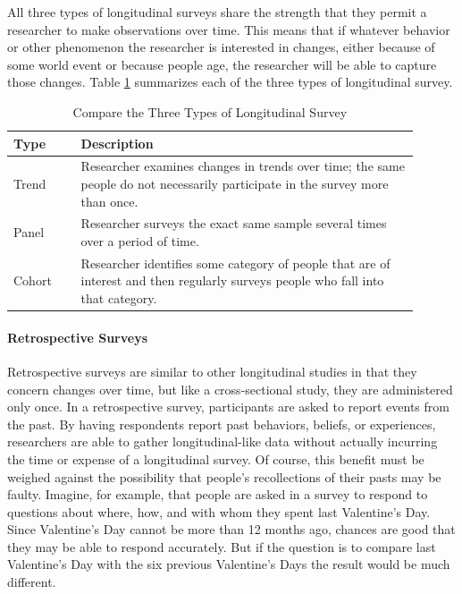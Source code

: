 All three types of longitudinal surveys share the strength that they permit a researcher to make observations over time. This means that if whatever behavior or other phenomenon the researcher is interested in changes, either because of some world event or because people age, the researcher will be able to capture those changes. Table \ref{tab08.01} summarizes each of the three types of longitudinal survey.

\begin{table}[H]
	\centering
	\begin{tabularx}{0.95\linewidth}{p{0.15\linewidth}p{0.75\linewidth}}
		\toprule
		\textbf{Type} & \textbf{Description} \\
		\midrule
		Trend & Researcher examines changes in trends over time; the same people do not necessarily participate in the survey more than once. \\
		Panel & Researcher surveys the exact same sample several times over a period of time. \\
		Cohort & Researcher identifies some category of people that are of interest and then regularly surveys people who fall into that category.\\
		\bottomrule
	\end{tabularx}
	\caption{Compare the Three Types of Longitudinal Survey}
	\label{tab08.01}
\end{table}

\paragraph{Retrospective Surveys}


Retrospective surveys are similar to other longitudinal studies in that they concern changes over time, but like a cross-sectional study, they are administered only once. In a retrospective survey, participants are asked to report events from the past. By having respondents report past behaviors, beliefs, or experiences, researchers are able to gather longitudinal-like data without actually incurring the time or expense of a longitudinal survey. Of course, this benefit must be weighed against the possibility that people's recollections of their pasts may be faulty. Imagine, for example, that people are asked in a survey to respond to questions about where, how, and with whom they spent last Valentine's Day. Since Valentine's Day cannot be more than 12 months ago, chances are good that they may be able to respond accurately. But if the question is to compare last Valentine's Day with the six previous Valentine's Days the result would be much different.

